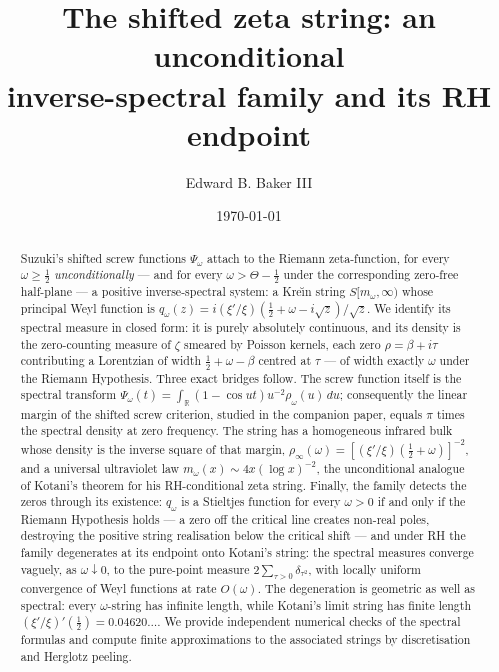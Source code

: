 \documentclass[11pt,reqno]{amsart}
\title[The shifted zeta string]
      {The shifted zeta string: an unconditional\\ inverse-spectral family and its RH endpoint}
\author{Edward B. Baker III}
\date{\today}
\theoremstyle{plain}
\theoremstyle{definition}
\newcommand{\R}{\mathbb{R}}
\begin{document}
\begin{abstract}
Suzuki's shifted screw functions $\Psi_\omega$ attach to the Riemann zeta-function, for every
$\omega\ge\tfrac12$ \emph{unconditionally} --- and for every $\omega>\Theta-\tfrac12$ under the
corresponding zero-free half-plane --- a positive inverse-spectral system: a Kre\u\i n string
$S[m_\omega,\infty)$ whose principal Weyl function is
$q_\omega(z)=i(\xi'/\xi)(\tfrac12+\omega-i\sqrt z)/\sqrt z$. We identify its spectral measure in
closed form: it is purely absolutely continuous, and its density is the zero-counting measure of
$\zeta$ smeared by Poisson kernels, each zero $\rho=\beta+i\tau$ contributing a Lorentzian of
width $\tfrac12+\omega-\beta$ centred at $\tau$ --- of width exactly $\omega$ under the Riemann
Hypothesis. Three exact bridges follow. The screw function itself is the spectral transform
$\Psi_\omega(t)=\int_\R(1-\cos ut)u^{-2}\rho_\omega(u)\,du$; consequently the linear margin of
the shifted screw criterion, studied in the companion paper, equals $\pi$ times the spectral
density at zero frequency. The string has a homogeneous infrared bulk whose density is the
inverse square of that margin, $\rho_\infty(\omega)=[(\xi'/\xi)(\tfrac12+\omega)]^{-2}$, and a
universal ultraviolet law $m_\omega(x)\sim4x(\log x)^{-2}$, the unconditional analogue of
Kotani's theorem for his RH-conditional zeta string. Finally, the family detects the zeros
through its existence: $q_\omega$ is a Stieltjes function for every $\omega>0$ if and only if
the Riemann Hypothesis holds --- a zero off the critical line creates non-real poles, destroying
the positive string realisation below the critical shift --- and under RH the family degenerates
at its endpoint onto Kotani's string: the spectral measures converge vaguely, as
$\omega\downarrow0$, to the pure-point measure $2\sum_{\tau>0}\delta_{\tau^2}$, with locally
uniform convergence of Weyl functions at rate $O(\omega)$. The degeneration is geometric as
well as spectral: every $\omega$-string has infinite length, while Kotani's limit string has
finite length $(\xi'/\xi)'(\tfrac12)=0.04620\ldots$. We provide independent numerical checks
of the spectral formulas and compute finite approximations to the associated strings by
discretisation and Herglotz peeling.
\end{abstract}

\maketitle

\setcounter{tocdepth}{1}
\tableofcontents
\end{document}
